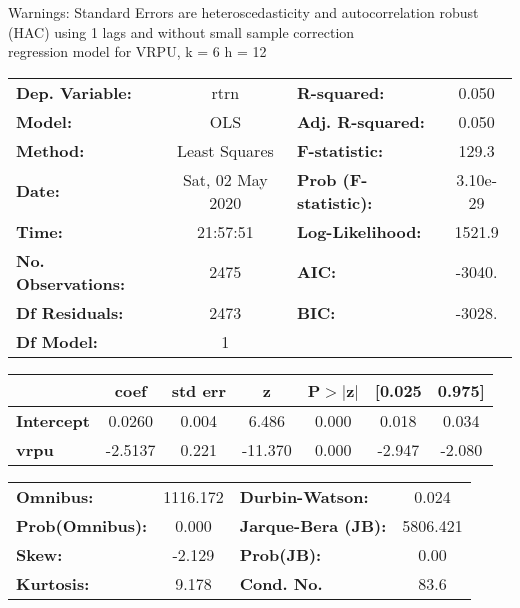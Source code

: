 Warnings: \newline
 [1] Standard Errors are heteroscedasticity and autocorrelation robust (HAC) using 1 lags and without small sample correction\\ 

regression model for VRPU, k = 6 h = 12\begin{center}
\begin{tabular}{lclc}
\toprule
\textbf{Dep. Variable:}    &       rtrn       & \textbf{  R-squared:         } &     0.050   \\
\textbf{Model:}            &       OLS        & \textbf{  Adj. R-squared:    } &     0.050   \\
\textbf{Method:}           &  Least Squares   & \textbf{  F-statistic:       } &     129.3   \\
\textbf{Date:}             & Sat, 02 May 2020 & \textbf{  Prob (F-statistic):} &  3.10e-29   \\
\textbf{Time:}             &     21:57:51     & \textbf{  Log-Likelihood:    } &    1521.9   \\
\textbf{No. Observations:} &        2475      & \textbf{  AIC:               } &    -3040.   \\
\textbf{Df Residuals:}     &        2473      & \textbf{  BIC:               } &    -3028.   \\
\textbf{Df Model:}         &           1      & \textbf{                     } &             \\
\bottomrule
\end{tabular}
\begin{tabular}{lcccccc}
                   & \textbf{coef} & \textbf{std err} & \textbf{z} & \textbf{P$> |$z$|$} & \textbf{[0.025} & \textbf{0.975]}  \\
\midrule
\textbf{Intercept} &       0.0260  &        0.004     &     6.486  &         0.000        &        0.018    &        0.034     \\
\textbf{vrpu}      &      -2.5137  &        0.221     &   -11.370  &         0.000        &       -2.947    &       -2.080     \\
\bottomrule
\end{tabular}
\begin{tabular}{lclc}
\textbf{Omnibus:}       & 1116.172 & \textbf{  Durbin-Watson:     } &    0.024  \\
\textbf{Prob(Omnibus):} &   0.000  & \textbf{  Jarque-Bera (JB):  } & 5806.421  \\
\textbf{Skew:}          &  -2.129  & \textbf{  Prob(JB):          } &     0.00  \\
\textbf{Kurtosis:}      &   9.178  & \textbf{  Cond. No.          } &     83.6  \\
\bottomrule
\end{tabular}
\end{center}

